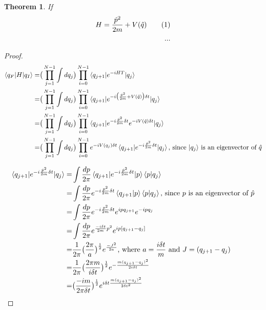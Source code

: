 \documentclass[]{article}
\newcommand\numberthis{\addtocounter{equation}{1}\tag{\theequation}}
\newtheorem{thm}{Theorem}
\begin{document}
\begin{thm}
	If
	\begin{align*}
		H = \frac{\hat{p}^2}{2m} + V(\hat{q})\numberthis \label{eq:H}\\
		...
	\end{align*}
\end{thm}
\begin{proof}
	\begin{align*}
		\braket{q_F\vert H\vert q_I} =& \big(\prod_{j=1}^{N-1} \int dq_j\big)\prod_{i=0}^{N-1} \braket{q_{j+1} \vert e^{-iHT} \vert q_j}\\
		=& \big(\prod_{j=1}^{N-1} \int dq_j\big)\prod_{i=0}^{N-1} \braket{q_{j+1} \vert e^{-i\big(\frac{\hat{p}^2}{2m} + V(\hat{q})\big)\delta t} \vert q_j}\\
		=& \big(\prod_{j=1}^{N-1} \int dq_j\big)\prod_{i=0}^{N-1} \braket{q_{j+1} \vert e^{-i\frac{\hat{p}^2}{2m} \delta t} e^{-i V(\hat{q}) \delta t} \vert q_j}\\
		=& \big(\prod_{j=1}^{N-1} \int dq_j\big)\prod_{i=0}^{N-1} e^{-i V(q_j) \delta t} \braket{q_{j+1} \vert e^{-i\frac{\hat{p}^2}{2m} \delta t}  \vert q_j} \text{, since $\ket{q_j}$ is an eigenvector of $\hat{q}$}
	\end{align*}
	
	\begin{align*}
		\braket{q_{j+1} \vert e^{-i\frac{\hat{p}^2}{2m} \delta t}  \vert q_j}=& \int \frac{dp}{2\pi}\braket{q_{j+1} \vert e^{-i\frac{\hat{p}^2}{2m} \delta t}  \vert p} \braket{p\vert q_j}\\
		=& \int \frac{dp}{2\pi} e^{-i\frac{p^2}{2m} \delta t} \braket{q_{j+1} \vert p} \braket{p\vert q_j} \text{, since $p$ is an eigenvector of $\hat{p}$}\\
		=& \int \frac{dp}{2\pi} e^{-i\frac{p^2}{2m} \delta t} e^{ip q_{j+1}} e^{-ip q_j} \\
		=& \int \frac{dp}{2\pi} e^{\frac{-i \delta t}{2m}p^2} e^{ip [q_{j+1}-q_j]} \\
		=& \frac{1}{2\pi} \big(\frac{2\pi}{a}\big)^\frac{1}{2} e^{\frac{-J^2}{2a}} \text{, where $a=\frac{i \delta t}{m}$ and $J=(q_{j+1}-q_j)$}\\
		=& \frac{1}{2\pi} \big(\frac{2\pi m}{i \delta t}\big)^\frac{1}{2} e^{-\frac{m (q_{j+1}-q_j)^2}{2 i \delta t}}\\
		=& \big(\frac{-i m}{2\pi \delta t}\big)^\frac{1}{2} e^{i \delta t \frac{m (q_{j+1}-q_j)^2}{2  {\delta t}^2}}
	\end{align*}
	

\end{proof}
\end{document}
